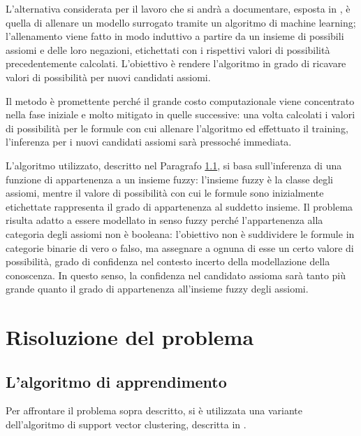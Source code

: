 \documentclass[12pt,a4paper]{report}
\begin{document}
L'alternativa considerata per il lavoro che si andrà a documentare, esposta in \cite{sacpaper}, è quella di allenare un modello surrogato tramite un algoritmo di machine learning; l'allenamento viene fatto in modo induttivo a partire da un insieme di possibili assiomi e delle loro negazioni, etichettati con i rispettivi valori di possibilità precedentemente calcolati. L'obiettivo è rendere l'algoritmo in grado di ricavare valori di possibilità per nuovi candidati assiomi.


Il metodo è promettente perché il grande costo computazionale viene concentrato nella fase iniziale e molto mitigato in quelle successive: una volta calcolati i valori di possibilità per le formule con cui allenare l'algoritmo ed effettuato il training, l'inferenza per i nuovi candidati assiomi sarà pressoché immediata.

L'algoritmo utilizzato, descritto nel Paragrafo \ref{algorithmParagraph}, si basa sull'inferenza di una funzione di appartenenza a un insieme fuzzy: l'insieme fuzzy è la classe degli assiomi, mentre il valore di possibilità con cui le formule sono inizialmente etichettate rappresenta il grado di appartenenza al suddetto insieme.
Il problema risulta adatto a essere modellato in senso fuzzy perché l'appartenenza alla categoria degli assiomi non è booleana: l'obiettivo non è suddividere le formule in categorie binarie di vero o falso, ma assegnare a ognuna di esse un certo valore di possibilità, grado di confidenza nel contesto incerto della modellazione della conoscenza. In questo senso, la confidenza nel candidato assioma sarà tanto più grande quanto il grado di appartenenza all'insieme fuzzy degli assiomi.

\chapter{Risoluzione del problema}
\section{L'algoritmo di apprendimento}\label{algorithmParagraph}
Per affrontare il problema sopra descritto, si è utilizzata una variante dell'algoritmo di support vector clustering, descritta in \cite{svpaper}.
\end{document}
